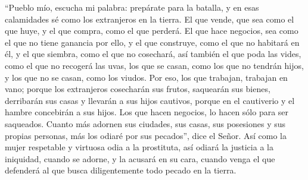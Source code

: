  ``Pueblo mío, escucha mi palabra: prepárate para la
batalla, y en esas calamidades sé como los extranjeros en la tierra.
 El que vende, que sea como el que huye, y el que compra,
como el que perderá.  El que hace negocios, sea como el
que no tiene ganancia por ello, y el que construye, como el que no
habitará en él,  y el que siembra, como el que no
cosechará, así también el que poda las vides, como el que no recogerá
las uvas,  los que se casan, como los que no tendrán
hijos, y los que no se casan, como los viudos.  Por eso,
los que trabajan, trabajan en vano;  porque los
extranjeros cosecharán sus frutos, saquearán sus bienes, derribarán sus
casas y llevarán a sus hijos cautivos, porque en el cautiverio y el
hambre concebirán a sus hijos.  Los que hacen negocios,
lo hacen sólo para ser saqueados. Cuanto más adornen sus ciudades, sus
casas, sus posesiones y sus propias personas,  más los
odiaré por sus pecados'', dice el Señor.  Así como la
mujer respetable y virtuosa odia a la prostituta,  así
odiará la justicia a la iniquidad, cuando se adorne, y la acusará en su
cara, cuando venga el que defenderá al que busca diligentemente todo
pecado en la tierra.

